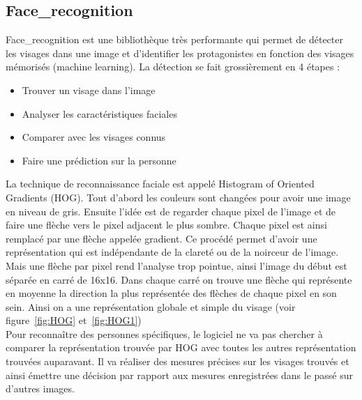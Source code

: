 \subsection{Face\_recognition}
Face\_recognition est une bibliothèque très performante qui permet de détecter
les visages dans une image et d'identifier les protagonistes en fonction des
visages mémorisés (machine learning). La détection se fait grossièrement en
4 étapes :
\vspace{0.5cm}
\begin{itemize}
  \item{Trouver un visage dans l'image}
  \item{Analyser les caractéristiques faciales}
  \item{Comparer avec les visages connus}
  \item{Faire une prédiction sur la personne}
\end{itemize}
\vspace{0.5cm}
La technique de reconnaissance faciale est appelé Histogram of Oriented Gradients
(HOG). Tout d'abord les couleurs sont changées pour avoir une image en niveau de gris.
Ensuite l'idée est de regarder chaque pixel de l'image et de faire une flèche vers
le pixel adjacent le plus sombre. Chaque pixel est ainsi remplacé par une flèche
appelée gradient. Ce procédé permet d'avoir une représentation qui est indépendante
de la clareté ou de la noirceur de l'image. Mais une flèche par pixel rend
l'analyse trop pointue, ainsi l'image du début est séparée en carré de 16x16.
Dans chaque carré on trouve une flèche qui représente en moyenne la direction
la plus représentée des flèches de chaque pixel en son sein. Ainsi on a une
représentation globale et simple du visage (voir figure~\ref{fig:HOG} et~\ref{fig:HOG1})
\\
Pour reconnaître des personnes spécifiques, le logiciel ne va pas chercher à
comparer la représentation trouvée par HOG avec toutes les autres représentation
trouvées auparavant. Il va réaliser des mesures précises sur les visages trouvés
et ainsi émettre une décision par rapport aux mesures enregistrées dans le passé
sur d'autres images.
\\
\newpage
